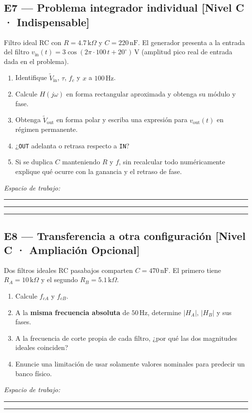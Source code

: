 \documentclass[11pt, a4paper]{article}
\newcommand{\phasor}[1]{\widetilde{#1}}
\begin{document}
\subsection*{E7 — Problema integrador individual \hfill \textnormal{\small [Nivel C · Indispensable]}}
Filtro ideal RC con $R = 4.7\,\text{k}\Omega$ y $C = 220\,\text{nF}$. El generador presenta a la entrada del filtro $v_{\text{in}}(t) = 3\cos(2\pi\cdot 100\,t + 20^\circ)\,\text{V}$ (amplitud pico real de entrada dada en el problema).
\begin{enumerate}\setlength\itemsep{0.15cm}
    \item[(a)] Identifique $\phasor{V}_{\text{in}}$, $\tau$, $f_c$ y $x$ a $100\,\text{Hz}$.
    \item[(b)] Calcule $H(j\omega)$ en forma rectangular aproximada y obtenga su módulo y fase.
    \item[(c)] Obtenga $\phasor{V}_{\text{out}}$ en forma polar y escriba una expresión para $v_{\text{out}}(t)$ en régimen permanente.
    \item[(d)] ¿\texttt{OUT} adelanta o retrasa respecto a \texttt{IN}?
    \item[(e)] Si se duplica $C$ manteniendo $R$ y $f$, sin recalcular todo numéricamente explique qué ocurre con la ganancia y el retraso de fase.
\end{enumerate}
\noindent\textit{Espacio de trabajo:}\par\vspace{0.35cm}
\noindent\rule{\textwidth}{0.3pt}\par\vspace{0.45cm}
\noindent\rule{\textwidth}{0.3pt}\par\vspace{0.45cm}
\noindent\rule{\textwidth}{0.3pt}

\subsection*{E8 — Transferencia a otra configuración \hfill \textnormal{\small [Nivel C · Ampliación Opcional]}}
Dos filtros ideales RC pasabajos comparten $C = 470\,\text{nF}$. El primero tiene $R_A = 10\,\text{k}\Omega$ y el segundo $R_B = 5.1\,\text{k}\Omega$.
\begin{enumerate}\setlength\itemsep{0.15cm}
    \item[(a)] Calcule $f_{cA}$ y $f_{cB}$.
    \item[(b)] A la \textbf{misma frecuencia absoluta} de $50\,\text{Hz}$, determine $|H_A|$, $|H_B|$ y sus fases.
    \item[(c)] A la frecuencia de corte propia de cada filtro, ¿por qué las dos magnitudes ideales coinciden?
    \item[(d)] Enuncie una limitación de usar solamente valores nominales para predecir un banco físico.
\end{enumerate}
\noindent\textit{Espacio de trabajo:}\par\vspace{0.35cm}
\noindent\rule{\textwidth}{0.3pt}\par\vspace{0.45cm}
\noindent\rule{\textwidth}{0.3pt}
\end{document}
